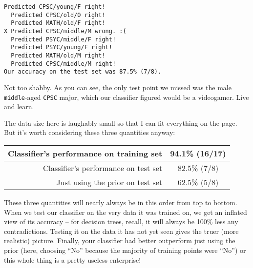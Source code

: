\begin{Verbatim}[fontsize=\footnotesize,samepage=true,frame=leftline,framesep=5mm,framerule=1mm]
  Predicted CPSC/young/F right!
  Predicted CPSC/old/O right!
  Predicted MATH/old/F right!
X Predicted CPSC/middle/M wrong. :(
  Predicted PSYC/middle/F right!
  Predicted PSYC/young/F right!
  Predicted MATH/old/M right!
  Predicted CPSC/middle/M right!
Our accuracy on the test set was 87.5% (7/8).
\end{Verbatim}

Not too shabby. As you can see, the only test point we missed was the male
\texttt{middle}-aged \texttt{CPSC} major, which our classifier figured would
be a videogamer. Live and learn.

The data size here is laughably small so that I can fit everything on the page.
But it's worth considering these three quantities anyway:

\begin{center}
\begin{tabular}{r|c}
Classifier's performance on training set & 94.1\% (16/17) \\
\hline
Classifier's performance on test set & 82.5\% (7/8) \\
\hline
Just using the prior on test set & 62.5\% (5/8) \\
\end{tabular}
\end{center}


These three quantities will nearly always be in this order from top to bottom.
When we test our classifier on the very data it was trained on, we get an
inflated view of its accuracy -- for decision trees, recall, it will always be
100\% less any contradictions. Testing it on the data it has not yet seen gives
the truer (more realistic) picture. Finally, your classifier had better
outperform just using the prior (here, choosing ``No'' because the majority of
training points were ``No'') or this whole thing is a pretty useless
enterprise!
